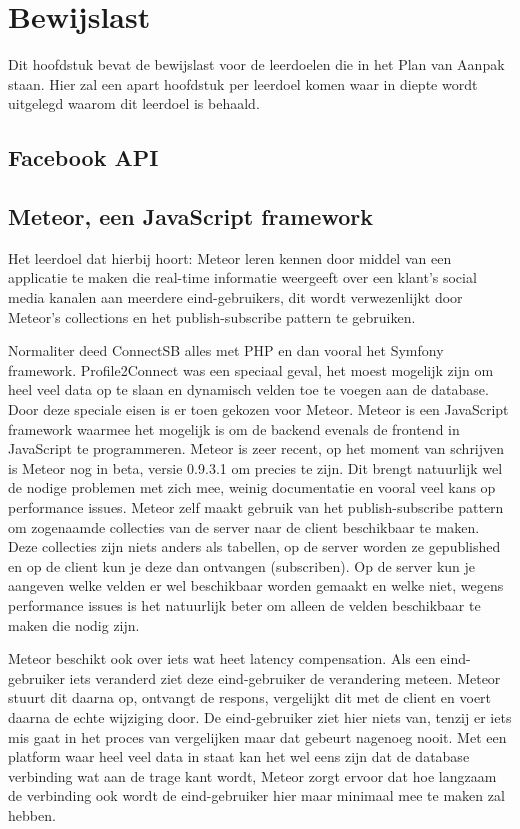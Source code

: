 \section{Bewijslast}
Dit hoofdstuk bevat de bewijslast voor de leerdoelen die in het Plan van Aanpak staan. Hier zal een apart hoofdstuk per leerdoel komen waar in diepte wordt uitgelegd waarom dit leerdoel is behaald.

\subsection{Facebook API}

\subsection{Meteor, een JavaScript framework}
Het leerdoel dat hierbij hoort: Meteor leren kennen door middel van een applicatie te maken die real-time informatie weergeeft over een klant’s social media kanalen aan meerdere eind-gebruikers, dit wordt verwezenlijkt door Meteor’s collections en het publish-subscribe pattern te gebruiken.

Normaliter deed ConnectSB alles met PHP en dan vooral het Symfony framework. Profile2Connect was een speciaal geval, het moest mogelijk zijn om heel veel data op te slaan en dynamisch velden toe te voegen aan de database. Door deze speciale eisen is er toen gekozen voor Meteor. Meteor is een JavaScript framework waarmee het mogelijk is om de backend evenals de frontend in JavaScript te programmeren. Meteor is zeer recent, op het moment van schrijven is Meteor nog in beta, versie 0.9.3.1 om precies te zijn. Dit brengt natuurlijk wel de nodige problemen met zich mee, weinig documentatie en vooral veel kans op performance issues. Meteor zelf maakt gebruik van het publish-subscribe pattern om zogenaamde collecties van de server naar de client beschikbaar te maken. Deze collecties zijn niets anders als tabellen, op de server worden ze gepublished en op de client kun je deze dan ontvangen (subscriben). Op de server kun je aangeven welke velden er wel beschikbaar worden gemaakt en welke niet, wegens performance issues is het natuurlijk beter om alleen de velden beschikbaar te maken die nodig zijn.

Meteor beschikt ook over iets wat heet latency compensation. Als een eind-gebruiker iets veranderd ziet deze eind-gebruiker de verandering meteen. Meteor stuurt dit daarna op, ontvangt de respons, vergelijkt dit met de client en voert daarna de echte wijziging door. De eind-gebruiker ziet hier niets van, tenzij er iets mis gaat in het proces van vergelijken maar dat gebeurt nagenoeg nooit. Met een platform waar heel veel data in staat kan het wel eens zijn dat de database verbinding wat aan de trage kant wordt, Meteor zorgt ervoor dat hoe langzaam de verbinding ook wordt de eind-gebruiker hier maar minimaal mee te maken zal hebben.

